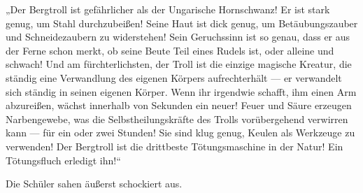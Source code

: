 „Der Bergtroll ist gefährlicher als der Ungarische Hornschwanz! Er ist stark genug, um Stahl durchzubeißen! Seine Haut ist dick genug, um Betäubungszauber und Schneidezaubern zu widerstehen! Sein Geruchssinn ist so genau, dass er aus der Ferne schon merkt, ob seine Beute Teil eines Rudels ist, oder alleine und schwach! Und am fürchterlichsten, der Troll ist die einzige magische Kreatur, die ständig eine Verwandlung des eigenen Körpers aufrechterhält — er verwandelt sich ständig in seinen eigenen Körper. Wenn ihr irgendwie schafft, ihm einen Arm abzureißen, wächst innerhalb von Sekunden ein neuer! Feuer und Säure erzeugen Narbengewebe, was die Selbstheilungskräfte des Trolls vorübergehend verwirren kann — für ein oder zwei Stunden! Sie sind klug genug, Keulen als Werkzeuge zu verwenden! Der Bergtroll ist die drittbeste Tötungsmaschine in der Natur! Ein Tötungsfluch erledigt ihn!“

Die Schüler sahen äußerst schockiert aus.

